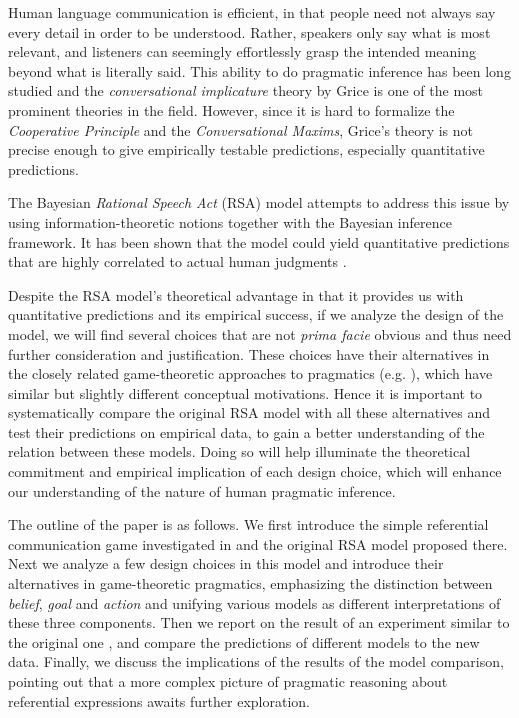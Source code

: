 Human language communication is efficient, in that people need not always say every detail in order to be understood. Rather, speakers only say what is most relevant, and listeners can seemingly effortlessly grasp the intended meaning beyond what is literally said. This ability to do pragmatic inference has been long studied and the \emph{conversational implicature} theory by Grice \cite{Grice} is one of the most prominent theories in the field. However, since it is hard to formalize the \emph{Cooperative Principle} and the \emph{Conversational Maxims}, Grice's theory is not precise enough to give empirically testable predictions, especially quantitative predictions.

The Bayesian \emph{Rational Speech Act} (RSA) model attempts to address this issue by using information-theoretic notions together with the Bayesian inference framework. It has been shown that the model could yield quantitative predictions that are highly correlated to actual human judgments \cite{Frank}.

Despite the RSA model's theoretical advantage in that it provides us with quantitative predictions and its empirical success, if we analyze the design of the model, we will find several choices that are not \emph{prima facie} obvious and thus need further consideration and justification. These choices have their alternatives in the closely related game-theoretic approaches to pragmatics (e.g. \cite{Benz2007,Jager2013}), which have similar but slightly different conceptual motivations. Hence it is important to systematically compare the original RSA model with all these alternatives and test their predictions on empirical data, to gain a better understanding of the relation between these models. Doing so will help illuminate the theoretical commitment and empirical implication of each design choice, which will enhance our understanding of the nature of human pragmatic inference.

The outline of the paper is as follows. We first introduce the simple referential communication game investigated in \cite{Frank} and the original RSA model proposed there. Next we analyze a few design choices in this model and introduce their alternatives in game-theoretic pragmatics, emphasizing the distinction between \emph{belief}, \emph{goal} and \emph{action} and unifying various models as different interpretations of these three components. Then we report on the result of an experiment similar to the original one \cite{Frank}, and compare the predictions of different models to the new data. Finally, we discuss the implications of the results of the model comparison, pointing out that a more complex picture of pragmatic reasoning about referential expressions awaits further exploration. 